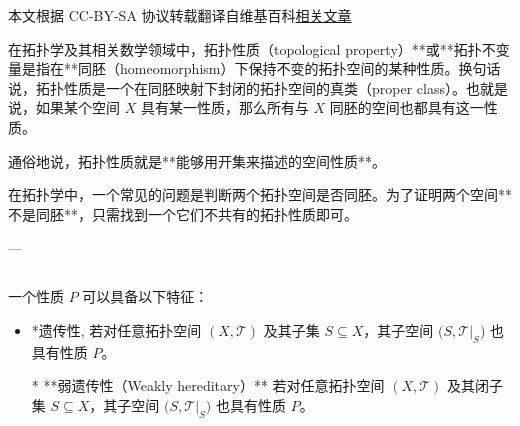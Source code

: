
本文根据 CC-BY-SA 协议转载翻译自维基百科\href{https://en.wikipedia.org/wiki/Topological_property}{相关文章}

在拓扑学及其相关数学领域中，拓扑性质（topological property）**或**拓扑不变量是指在**同胚（homeomorphism）\*\*下保持不变的拓扑空间的某种性质。换句话说，拓扑性质是一个在同胚映射下封闭的拓扑空间的真类（proper class）。也就是说，如果某个空间 $X$ 具有某一性质，那么所有与 $X$ 同胚的空间也都具有这一性质。

通俗地说，拓扑性质就是**能够用开集来描述的空间性质**。

在拓扑学中，一个常见的问题是判断两个拓扑空间是否同胚。为了证明两个空间**不是同胚**，只需找到一个它们不共有的拓扑性质即可。

---

\subsection{ }

一个性质 $P$ 可以具备以下特征：

\begin{itemize}
\item *遗传性,
  若对任意拓扑空间 $(X, \mathcal{T})$ 及其子集 $S \subseteq X$，其子空间 $\bigl(S, \mathcal{T}|_S\bigr)$ 也具有性质 $P$。

* **弱遗传性（Weakly hereditary）**
  若对任意拓扑空间 $(X, \mathcal{T})$ 及其闭子集 $S \subseteq X$，其子空间 $\bigl(S, \mathcal{T}|_S\bigr)$ 也具有性质 $P$。

\end{itemize}